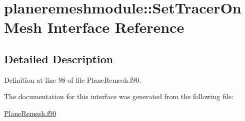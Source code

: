 \hypertarget{interfaceplaneremeshmodule_1_1_set_tracer_on_mesh}{\section{planeremeshmodule\+:\+:Set\+Tracer\+On\+Mesh Interface Reference}
\label{interfaceplaneremeshmodule_1_1_set_tracer_on_mesh}
}


\subsection{Detailed Description}


Definition at line 98 of file Plane\+Remesh.\+f90.



The documentation for this interface was generated from the following file\+:\begin{DoxyCompactItemize}
\item 
\hyperlink{_plane_remesh_8f90}{Plane\+Remesh.\+f90}\end{DoxyCompactItemize}
